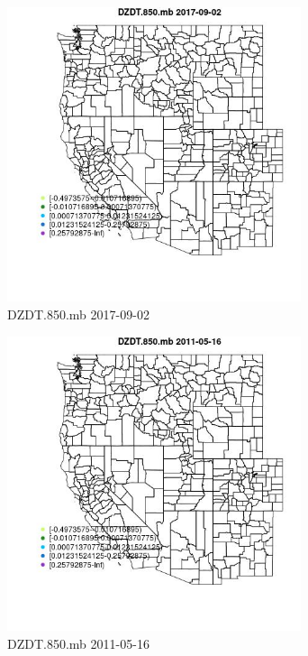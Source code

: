\begin{figure} 
\centering  
\includegraphics[width=0.77\textwidth]{Code_Outputs/Report_ML_input_PM25_Step4_part_e_de_duplicated_aveswNAs_MapObsDZDT850mb2017-09-02.jpg} 
\caption{\label{fig:Report_ML_input_PM25_Step4_part_e_de_duplicated_aveswNAsMapObsDZDT850mb2017-09-02}DZDT.850.mb 2017-09-02} 
\end{figure} 
 

\begin{figure} 
\centering  
\includegraphics[width=0.77\textwidth]{Code_Outputs/Report_ML_input_PM25_Step4_part_e_de_duplicated_aveswNAs_MapObsDZDT850mb2011-05-16.jpg} 
\caption{\label{fig:Report_ML_input_PM25_Step4_part_e_de_duplicated_aveswNAsMapObsDZDT850mb2011-05-16}DZDT.850.mb 2011-05-16} 
\end{figure} 
 

